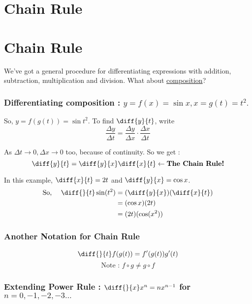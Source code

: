 

\section*{\centering Chain Rule}  

\bigbreak
\section{Chain Rule}

We've got a general procedure for differentiating expressions with addition, subtraction, multiplication and division.
What about \underline{composition}?

\subsubsection*{Differentiating composition : $y = f(x) = \sin x , x = g(t) = t^2.$}

So, $y = f(g(t)) = \sin t^2$. To find $\diff{y}{t}$, write
$$ \frac{\Delta y}{\Delta t} = \frac{\Delta y}{\Delta x} \cdot \frac{\Delta x}{\Delta t} $$

As $\Delta t \to 0, \Delta x \to 0$ too, because of continuity. So we get : 
$$ \diff{y}{t} = \diff{y}{x} \diff{x}{t} \leftarrow \textbf{The Chain Rule!} $$

In this example, $\diff{x}{t} = 2t$ and $\diff{y}{x} = \cos x$.
\begin{equation*}
\begin{split}
	\text{So, $\quad$} \diff{}{t} \sin(t^2) 
		& = (\diff{y}{x})(\diff{x}{t}) \\
		& = (\cos x)(2t) \\
		& = (2t)(\cos(x^2)) \\
\end{split}
\end{equation*}

\subsubsection*{Another Notation for Chain Rule}

$$ \diff{}{t}f(g(t)) = f'(g(t))g'(t) $$
$$ \text{Note : } f \circ g \neq g \circ f $$

\subsubsection*{Extending Power Rule : $\diff{}{x} x^n = nx^{n-1}$ for $n = 0, -1, -2, -3\ldots$}

